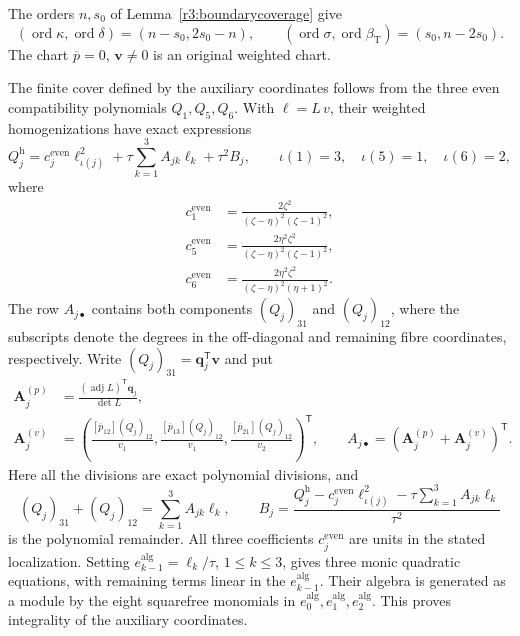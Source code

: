 \documentclass[11pt,a4paper]{article}
\numberwithin{equation}{section}
\theoremstyle{plain}
\theoremstyle{definition}
\theoremstyle{remark}
\begin{document}
The orders $n,s_0$ of Lemma~\ref{r3:boundarycoverage} give
\[
 (\operatorname{ord}\kappa,\operatorname{ord}\delta)
       =(n-s_0,2s_0-n),\qquad
 (\operatorname{ord}\sigma,\operatorname{ord}\beta_{\mathrm T})
       =(s_0,n-2s_0).
\]
The chart $\overline p=0$, $\boldsymbol v\ne0$ is an original
weighted chart.

The finite cover defined by the auxiliary coordinates follows from the three even compatibility polynomials $Q_1,Q_5,Q_6$. With
$\ell=L\,v$, their weighted homogenizations have exact expressions
\[
 Q_j^{\mathrm h}
   =c_j^{\mathrm{even}}\ell_{\iota(j)}^2
       +\tau\sum_{k=1}^3 A_{jk}\ell_k+\tau^2B_j,
 \qquad \iota(1)=3,\quad\iota(5)=1,\quad\iota(6)=2,
\]
where
\[
 \begin{aligned}
 c_1^{\mathrm{even}}&=\frac{2\zeta ^2}{(\zeta -\eta )^2(\zeta -1)^2},\\
 c_5^{\mathrm{even}}&=\frac{2\eta ^2\zeta ^2}{(\zeta -\eta )^2(\zeta -1)^2},\\
 c_6^{\mathrm{even}}&=\frac{2\eta ^2\zeta ^2}{(\zeta -\eta )^2(\eta +1)^2}.
 \end{aligned}
\]
The row $A_{j\bullet}$ contains both components
$(Q_j)_{31}$ and $(Q_j)_{12}$, where the subscripts denote the
degrees in the off-diagonal and remaining fibre coordinates, respectively.
Write $(Q_j)_{31}=\boldsymbol q_j^{\mathsf T}\boldsymbol v$ and put
\[
 \begin{aligned}
 \boldsymbol A_j^{(p)}
   &=\frac{(\operatorname{adj}L)^{\mathsf T}\boldsymbol q_j}{\det L},\\
 \boldsymbol A_j^{(v)}
   &=\left(\frac{[\overline p_{12}](Q_j)_{12}}{v_1},
           \frac{[\overline p_{13}](Q_j)_{12}}{v_1},
           \frac{[\overline p_{21}](Q_j)_{12}}{v_2}\right)^{\mathsf T},
 \qquad A_{j\bullet}=(\boldsymbol A_j^{(p)}+
                      \boldsymbol A_j^{(v)})^{\mathsf T}.
 \end{aligned}
\]
Here all the divisions are exact polynomial divisions, and
\[
 (Q_j)_{31}+(Q_j)_{12}=\sum_{k=1}^3A_{jk}\ell_k,
 \qquad
 B_j=\frac{Q_j^{\mathrm h}-c_j^{\mathrm{even}}\ell_{\iota(j)}^2
                 -\tau\sum_{k=1}^3A_{jk}\ell_k}{\tau^2}
\]
is the polynomial remainder.
All three coefficients $c_j^{\mathrm{even}}$ are units in the
stated localization. Setting $e_{k-1}^{\mathrm{alg}}=\ell_k/\tau$, $1\le k\le3$, gives
three monic quadratic equations, with remaining terms linear in
the $e_{k-1}^{\mathrm{alg}}$. Their algebra is generated as a module by the eight
squarefree monomials in $e_0^{\mathrm{alg}},e_1^{\mathrm{alg}},e_2^{\mathrm{alg}}$. This proves integrality
of the auxiliary coordinates.
\end{document}
